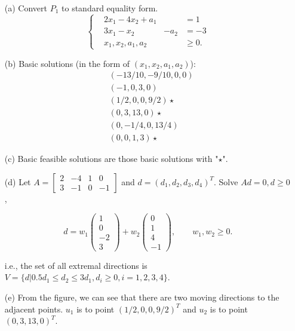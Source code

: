 \documentclass[12pt]{article}
\begin{document}
\begin{enumerate}
\item [(a)]
Convert $P_1$ to standard equality form.
$$
\left\{
\begin{aligned}
& 2x_1 - 4x_2 + a_1 & & = 1 \\
& 3x_1 - x_2   & -a_2 & = -3 \\
& x_1, x_2, a_1, a_2 & & \geqslant 0.
\end{aligned}
\right.
$$

\item[(b)]
Basic solutions (in the form of $(x_1, x_2, a_1, a_2)$): 
$$
\begin{aligned}
&(-13/10, -9/10, 0, 0)   \\ 
&(-1, 0, 3, 0)\\ 
&(1/2, 0, 0, 9/2) \star\\
& (0, 3, 13, 0)\star\\ 
 &(0, -1/4, 0, 13/4)\\
 & (0, 0, 1, 3)\star
\end{aligned}
$$

\item[(c)]
Basic feasible solutions are those basic solutions with "$\star$".

\item[(d)]
Let $A = \begin{bmatrix}
2 & -4 & 1 & 0 \\
3 & -1 & 0 & -1
\end{bmatrix}$ and $d = (d_1, d_2, d_3, d_4)^T$. Solve $Ad =0, d\geqslant 0$,

$$
d = w_1 \begin{pmatrix}
1 \\
0 \\
-2\\
3
\end{pmatrix} + w_2 \begin{pmatrix}
0 \\
1 \\
4 \\
-1
\end{pmatrix}, \qquad w_1, w_2 \geqslant 0.
$$

i.e., the set of all extremal directions is $V = \{d | 0.5 d_1 \leqslant d_2 \leqslant 3d_1, d_i \geqslant 0, i = 1,2,3,4  \}$.



\item[(e)]
From the figure, we can see that there are two moving directions to the adjacent points. $u_1$ is to point $(1/2, 0, 0, 9/2)^T$ and $u_2$ is to point $(0, 3, 13, 0)^T$.


\end{enumerate}
\end{document}
